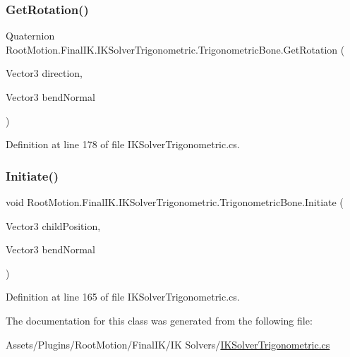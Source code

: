 \subsubsection{\texorpdfstring{Get\+Rotation()}{GetRotation()}}
{\footnotesize\ttfamily Quaternion Root\+Motion.\+Final\+I\+K.\+I\+K\+Solver\+Trigonometric.\+Trigonometric\+Bone.\+Get\+Rotation (\begin{DoxyParamCaption}\item[{Vector3}]{direction,  }\item[{Vector3}]{bend\+Normal }\end{DoxyParamCaption})}



Definition at line 178 of file I\+K\+Solver\+Trigonometric.\+cs.

\mbox{\label{class_root_motion_1_1_final_i_k_1_1_i_k_solver_trigonometric_1_1_trigonometric_bone_acecd41e5aac8935b66a35d0e5ee1de89}} 
\subsubsection{\texorpdfstring{Initiate()}{Initiate()}}
{\footnotesize\ttfamily void Root\+Motion.\+Final\+I\+K.\+I\+K\+Solver\+Trigonometric.\+Trigonometric\+Bone.\+Initiate (\begin{DoxyParamCaption}\item[{Vector3}]{child\+Position,  }\item[{Vector3}]{bend\+Normal }\end{DoxyParamCaption})}



Definition at line 165 of file I\+K\+Solver\+Trigonometric.\+cs.



The documentation for this class was generated from the following file\+:\begin{DoxyCompactItemize}
\item 
Assets/\+Plugins/\+Root\+Motion/\+Final\+I\+K/\+I\+K Solvers/\mbox{\hyperlink{_i_k_solver_trigonometric_8cs}{I\+K\+Solver\+Trigonometric.\+cs}}\end{DoxyCompactItemize}
